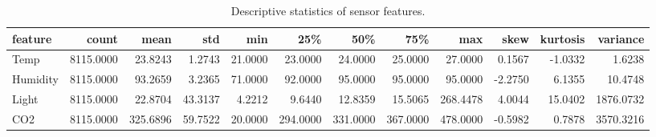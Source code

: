 \begin{table}
\caption{Descriptive statistics of sensor features.}
\label{tab:descstats}
\begin{tabular}{lrrrrrrrrrrr}
\toprule
feature & count & mean & std & min & 25\% & 50\% & 75\% & max & skew & kurtosis & variance \\
\midrule
Temp & 8115.0000 & 23.8243 & 1.2743 & 21.0000 & 23.0000 & 24.0000 & 25.0000 & 27.0000 & 0.1567 & -1.0332 & 1.6238 \\
Humidity & 8115.0000 & 93.2659 & 3.2365 & 71.0000 & 92.0000 & 95.0000 & 95.0000 & 95.0000 & -2.2750 & 6.1355 & 10.4748 \\
Light & 8115.0000 & 22.8704 & 43.3137 & 4.2212 & 9.6440 & 12.8359 & 15.5065 & 268.4478 & 4.0044 & 15.0402 & 1876.0732 \\
CO2 & 8115.0000 & 325.6896 & 59.7522 & 20.0000 & 294.0000 & 331.0000 & 367.0000 & 478.0000 & -0.5982 & 0.7878 & 3570.3216 \\
\bottomrule
\end{tabular}
\end{table}
